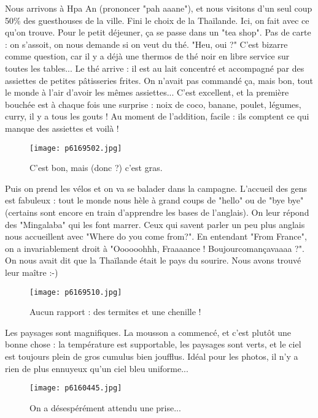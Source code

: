 \documentclass{book}
\begin{document}
Nous arrivons à Hpa An (prononcer "pah aaane"), et nous visitons d'un seul coup 50\% des guesthouses de la ville. Fini le choix de la Thaïlande. Ici, on fait avec ce qu'on trouve. Pour le petit déjeuner, ça se passe dans un "tea shop". Pas de carte : on s’assoit, on nous demande si on veut du thé. "Heu, oui ?" C'est bizarre comme question, car il y a déjà une thermos de thé noir en libre service sur toutes les tables... Le thé arrive : il est au lait concentré et accompagné par des assiettes de petites pâtisseries frites. On n'avait pas commandé ça, mais bon, tout le monde à l'air d'avoir les mêmes assiettes... C'est excellent, et la première bouchée est à chaque fois une surprise : noix de coco, banane, poulet, légumes, curry, il y a tous les gouts ! Au moment de l'addition, facile : ils comptent ce qui manque des assiettes et voilà !


\begin{figure}[h]
\centering
\texttt{[image: p6169502.jpg]}
\caption*{C'est bon, mais (donc ?) c'est gras.}
\end{figure}

Puis on prend les vélos et on va se balader dans la campagne. L'accueil des gens est fabuleux : tout le monde nous hèle à grand coups de "hello" ou de "bye bye" (certains sont encore en train d'apprendre les bases de l'anglais). On leur répond des "Mingalaba" qui les font marrer. Ceux qui savent parler un peu plus anglais nous accueillent avec "Where do you come from?". En entendant "From France", on a invariablement droit à "Oooooohhh, Fraaaance ! Boujourcomançavaaaa ?". On nous avait dit que la Thaïlande était le pays du sourire. Nous avons trouvé leur maître :-)


\begin{figure}[h]
\centering
\texttt{[image: p6169510.jpg]}
\caption*{Aucun rapport : des termites et une chenille !}
\end{figure}

Les paysages sont magnifiques. La mousson a commencé, et c'est plutôt une bonne chose : la température est supportable, les paysages sont verts, et le ciel est toujours plein de gros cumulus bien joufflus. Idéal pour les photos, il n'y a rien de plus ennuyeux qu'un ciel bleu uniforme...


\begin{figure}[h]
\centering
\texttt{[image: p6160445.jpg]}
\caption*{On a désespérément attendu une prise...}
\end{figure}
\end{document}

